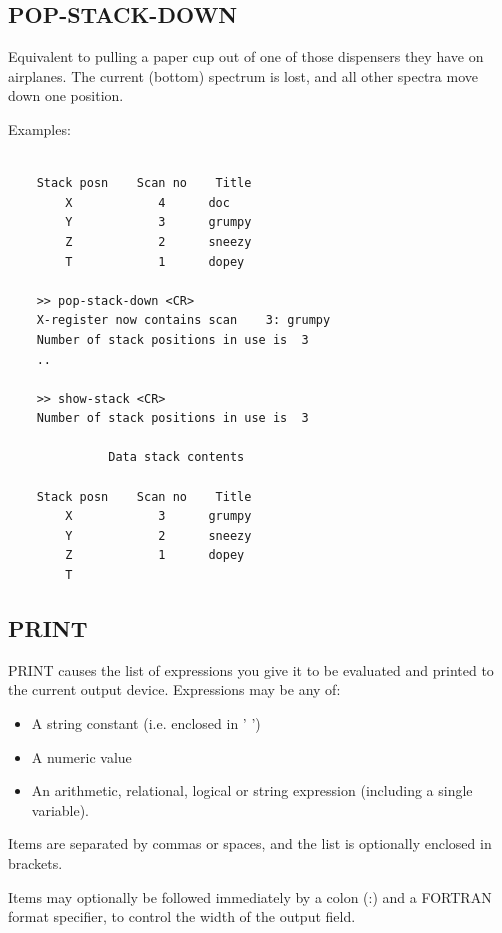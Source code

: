 \documentclass[11pt,twoside]{report}
\begin{document}
\subsection{POP-STACK-DOWN} 

Equivalent to pulling a paper cup out of one of those dispensers they have on
airplanes. The current (bottom) spectrum is lost, and all other spectra
move down one position.

Examples:
\begin{verbatim}

    Stack posn    Scan no    Title
        X            4      doc                       
        Y            3      grumpy                    
        Z            2      sneezy                    
        T            1      dopey                     

    >> pop-stack-down <CR>
    X-register now contains scan    3: grumpy
    Number of stack positions in use is  3
    ..

    >> show-stack <CR>
    Number of stack positions in use is  3

              Data stack contents

    Stack posn    Scan no    Title
        X            3      grumpy                    
        Y            2      sneezy                    
        Z            1      dopey                     
        T                                             

\end{verbatim}

\subsection{PRINT} 

PRINT causes the list of expressions you give it to be evaluated and printed to
the current output device. Expressions may be any of:
\begin{itemize}
\item    A string constant (i.e. enclosed in ' ')
\item    A numeric value
\item    An arithmetic, relational, logical or string expression (including a single variable).
\end{itemize}
Items are separated by commas or spaces, and the list is optionally enclosed
in brackets.

Items may optionally be followed immediately by a colon (:) and a FORTRAN
format specifier, to control the width of the output field.
\end{document}
